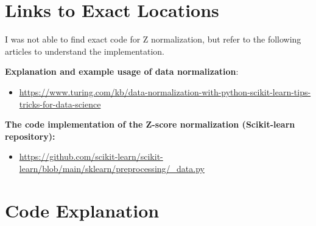 \documentclass{article}
\begin{document}

\section{Links to Exact Locations} \label{sec:links}
I was not able to find exact code for Z normalization, but refer to the following articles to understand the implementation.

\textbf{Explanation and example usage of data normalization}:
\begin{itemize} \item \url{https://www.turing.com/kb/data-normalization-with-python-scikit-learn-tips-tricks-for-data-science} \end{itemize}

\textbf{The code implementation of the Z-score normalization (Scikit-learn repository):}
\begin{itemize}  \item \url{https://github.com/scikit-learn/scikit-learn/blob/main/sklearn/preprocessing/_data.py} \end{itemize}

\section{Code Explanation} \label{sec:code}













\end{document}
